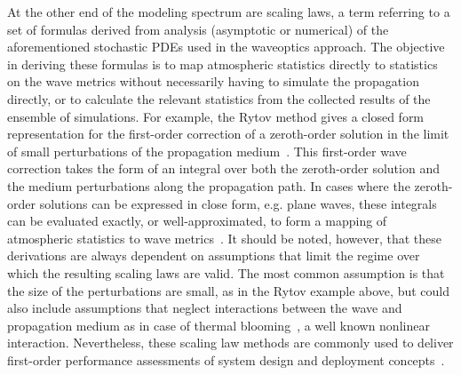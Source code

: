 \documentclass[9pt,twocolumn,twoside]{osajnl}
\begin{document}
At the other end of the modeling spectrum are scaling laws, a term referring to a set of formulas 
derived from analysis (asymptotic or numerical) of the aforementioned stochastic PDEs used in the 
waveoptics approach.  The objective in deriving these formulas is to map atmospheric statistics 
directly to statistics on the wave metrics without necessarily having to simulate the propagation 
directly, or to calculate the relevant statistics from the collected results of the ensemble of simulations.  
For example, the Rytov method gives a closed form representation for the first-order correction 
of a zeroth-order solution in the limit of small perturbations of the propagation 
medium~\cite{andrews2005laser, noriega2007rytov, wanjun2018propagation}.  
This first-order wave correction takes the form of an integral over both the zeroth-order solution 
and the medium perturbations along the propagation path.  
In cases where the zeroth-order solutions can be expressed in close form, e.g. plane waves, 
these integrals can be evaluated exactly, or well-approximated, to form a mapping of atmospheric statistics to 
wave metrics~\cite{andrews2001theory, andrews2005laser, andrews2006strehl, noriega2007rytov}.  
It should be noted, however, that these derivations are always dependent on assumptions that 
limit the regime over which the resulting scaling laws are valid.  
The most common assumption is that the size of the perturbations are small, as in the Rytov 
example above, but could also include assumptions that neglect interactions between the wave 
and propagation medium as in case of thermal blooming~\cite{smith1977high, akers2019numerical}, 
a well known nonlinear interaction.  Nevertheless, these scaling law methods are commonly used 
to deliver first-order performance assessments of system design and deployment 
concepts~\cite{yura1971atmospheric, whiteley2010scaling, kitsios2012subgrid, van2013enhanced, shakir2016general}.
\end{document}
